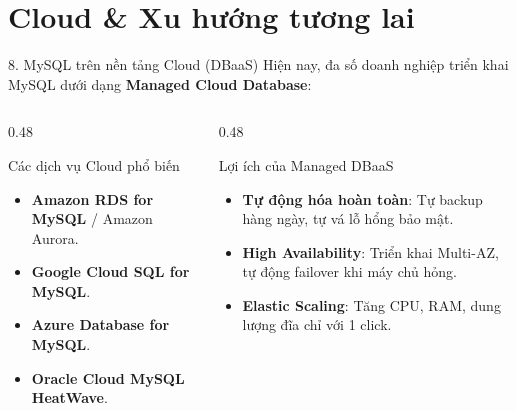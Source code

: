 \documentclass[aspectratio=169,11pt]{beamer}
\newcommand{\kw}[1]{\textcolor{dbblue}{\textbf{#1}}}
\newcommand{\smallgap}{\vspace{0.25em}}
\begin{document}
\section{Cloud \& Xu hướng tương lai}
\begin{frame}{8. MySQL trên nền tảng Cloud (DBaaS)}
Hiện nay, đa số doanh nghiệp triển khai MySQL dưới dạng \kw{Managed Cloud Database}:
\smallgap
\begin{columns}[t]
  \begin{column}{0.48\textwidth}
    \begin{block}{Các dịch vụ Cloud phổ biến}
      \begin{itemize}\footnotesize
        \item \textbf{Amazon RDS for MySQL} / Amazon Aurora.
        \item \textbf{Google Cloud SQL for MySQL}.
        \item \textbf{Azure Database for MySQL}.
        \item \textbf{Oracle Cloud MySQL HeatWave}.
      \end{itemize}
    \end{block}
  \end{column}
  \begin{column}{0.48\textwidth}
    \begin{exampleblock}{Lợi ích của Managed DBaaS}
      \begin{itemize}\footnotesize
        \item \textbf{Tự động hóa hoàn toàn}: Tự backup hàng ngày, tự vá lỗ hổng bảo mật.
        \item \textbf{High Availability}: Triển khai Multi-AZ, tự động failover khi máy chủ hỏng.
        \item \textbf{Elastic Scaling}: Tăng CPU, RAM, dung lượng đĩa chỉ với 1 click.
      \end{itemize}
    \end{exampleblock}
  \end{column}
\end{columns}
\end{frame}
\end{document}

